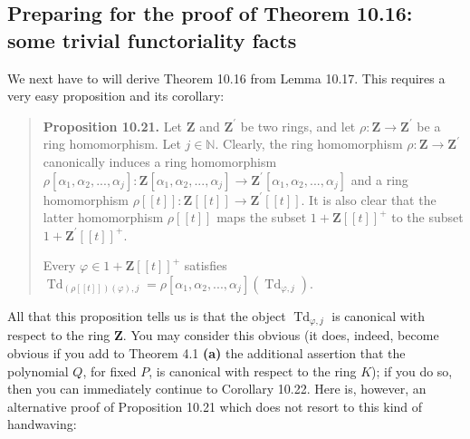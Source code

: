 \documentclass[numbers=enddot,12pt,final,onecolumn,notitlepage]{scrartcl}%
\begin{document}
\subsection{Preparing for the proof of Theorem 10.16: some trivial
functoriality facts}

We next have to will derive Theorem 10.16 from Lemma 10.17. This requires a
very easy proposition and its corollary:

\begin{quote}
\textbf{Proposition 10.21.} Let $\mathbf{Z}$ and $\mathbf{Z}^{\prime}$ be two
rings, and let $\rho:\mathbf{Z}\rightarrow\mathbf{Z}^{\prime}$ be a ring
homomorphism. Let $j\in\mathbb{N}$. Clearly, the ring homomorphism
$\rho:\mathbf{Z}\rightarrow\mathbf{Z}^{\prime}$ canonically induces a ring
homomorphism $\rho\left[  \alpha_{1},\alpha_{2},...,\alpha_{j}\right]
:\mathbf{Z}\left[  \alpha_{1},\alpha_{2},...,\alpha_{j}\right]  \rightarrow
\mathbf{Z}^{\prime}\left[  \alpha_{1},\alpha_{2},...,\alpha_{j}\right]  $ and
a ring homomorphism $\rho\left[  \left[  t\right]  \right]  :\mathbf{Z}\left[
\left[  t\right]  \right]  \rightarrow\mathbf{Z}^{\prime}\left[  \left[
t\right]  \right]  $. It is also clear that the latter homomorphism
$\rho\left[  \left[  t\right]  \right]  $ maps the subset $1+\mathbf{Z}\left[
\left[  t\right]  \right]  ^{+}$ to the subset $1+\mathbf{Z}^{\prime}\left[
\left[  t\right]  \right]  ^{+}$.

Every $\varphi\in1+\mathbf{Z}\left[  \left[  t\right]  \right]  ^{+}$
satisfies $\operatorname*{Td}\nolimits_{\left(  \rho\left[  \left[  t\right]
\right]  \right)  \left(  \varphi\right)  ,j}=\rho\left[  \alpha_{1}%
,\alpha_{2},...,\alpha_{j}\right]  \left(  \operatorname*{Td}%
\nolimits_{\varphi,j}\right)  $.
\end{quote}

All that this proposition tells us is that the object $\operatorname*{Td}%
\nolimits_{\varphi,j}$ is canonical with respect to the ring $\mathbf{Z}$. You
may consider this obvious (it does, indeed, become obvious if you add to
Theorem 4.1 \textbf{(a)} the additional assertion that the polynomial $Q$, for
fixed $P$, is canonical with respect to the ring $K$); if you do so, then you
can immediately continue to Corollary 10.22. Here is, however, an alternative
proof of Proposition 10.21 which does not resort to this kind of handwaving:
\end{document}
